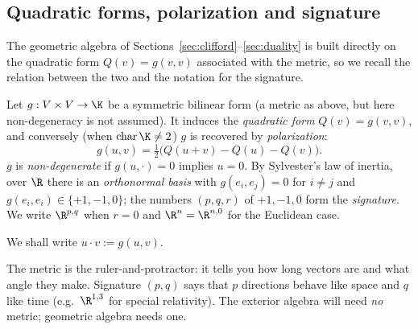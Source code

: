 \subsection{Quadratic forms, polarization and signature}\label{sec:quadform}
The geometric algebra of Sections~\ref{sec:clifford}--\ref{sec:duality} is built directly on the quadratic form $Q(v)=g(v,v)$
associated with the metric, so we recall the relation between the two and the notation for the signature.
\begin{definition}
Let $g:V\times V\to\K$ be a symmetric bilinear form (a metric as above, but here non-degeneracy is not assumed). It induces the
\emph{quadratic form} $Q(v)=g(v,v)$, and conversely (when $\mathrm{char}\,\K\neq2$) $g$ is
recovered by \emph{polarization}:
\begin{equation}\label{eq:polar}
  g(u,v)=\tfrac12\bigl(Q(u+v)-Q(u)-Q(v)\bigr).
\end{equation}
$g$ is \emph{non-degenerate} if $g(u,\cdot)=0$ implies $u=0$. By Sylvester's law of inertia, over
$\R$ there is an \emph{orthonormal basis} with $g(e_i,e_j)=0$ for $i\neq j$ and
$g(e_i,e_i)\in\{+1,-1,0\}$; the numbers $(p,q,r)$ of $+1,-1,0$ form the \emph{signature}.
We write $\R^{p,q}$ when $r=0$ and $\R^n=\R^{n,0}$ for the Euclidean case.
\end{definition}

We shall write $u\cdot v:=g(u,v)$.

\begin{intuition}
The metric is the ruler-and-protractor: it tells you how long vectors are and what angle they make.
Signature $(p,q)$ says that $p$ directions behave like space and $q$ like time (e.g.\ $\R^{1,3}$ for
special relativity). The exterior algebra will need \emph{no} metric; geometric algebra needs one.
\end{intuition}



